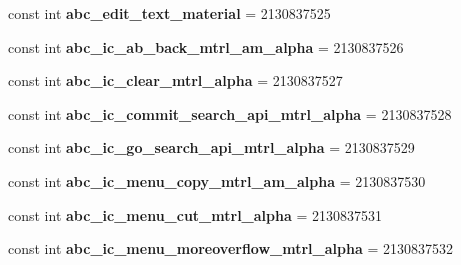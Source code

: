 \begin{DoxyCompactItemize}
const int {\bfseries abc\+\_\+edit\+\_\+text\+\_\+material} = 2130837525
\item 
\mbox{\label{class_pinned_app_1_1_droid_1_1_resource_1_1_drawable_a5049c8050429b15ac073f5ec425edf86}} 
const int {\bfseries abc\+\_\+ic\+\_\+ab\+\_\+back\+\_\+mtrl\+\_\+am\+\_\+alpha} = 2130837526
\item 
\mbox{\label{class_pinned_app_1_1_droid_1_1_resource_1_1_drawable_a880f52d9e8a2ccd08093716b772c155c}} 
const int {\bfseries abc\+\_\+ic\+\_\+clear\+\_\+mtrl\+\_\+alpha} = 2130837527
\item 
\mbox{\label{class_pinned_app_1_1_droid_1_1_resource_1_1_drawable_a0c8653b72ac0aa51f3f20324cf7576b2}} 
const int {\bfseries abc\+\_\+ic\+\_\+commit\+\_\+search\+\_\+api\+\_\+mtrl\+\_\+alpha} = 2130837528
\item 
\mbox{\label{class_pinned_app_1_1_droid_1_1_resource_1_1_drawable_aa462a14f62f23922d104cf4d9b313751}} 
const int {\bfseries abc\+\_\+ic\+\_\+go\+\_\+search\+\_\+api\+\_\+mtrl\+\_\+alpha} = 2130837529
\item 
\mbox{\label{class_pinned_app_1_1_droid_1_1_resource_1_1_drawable_aae109c605088db28630641b887163f43}} 
const int {\bfseries abc\+\_\+ic\+\_\+menu\+\_\+copy\+\_\+mtrl\+\_\+am\+\_\+alpha} = 2130837530
\item 
\mbox{\label{class_pinned_app_1_1_droid_1_1_resource_1_1_drawable_a4cc1a13525d7b1b38eb1b04698281f0d}} 
const int {\bfseries abc\+\_\+ic\+\_\+menu\+\_\+cut\+\_\+mtrl\+\_\+alpha} = 2130837531
\item 
\mbox{\label{class_pinned_app_1_1_droid_1_1_resource_1_1_drawable_a551be39c226e0798d8ff12299771effb}} 
const int {\bfseries abc\+\_\+ic\+\_\+menu\+\_\+moreoverflow\+\_\+mtrl\+\_\+alpha} = 2130837532
\item 
\mbox{\label{class_pinned_app_1_1_droid_1_1_resource_1_1_drawable_a67d338a70b7fba62a58e4b2bcbbfd223}} 

\end{DoxyCompactItemize}
